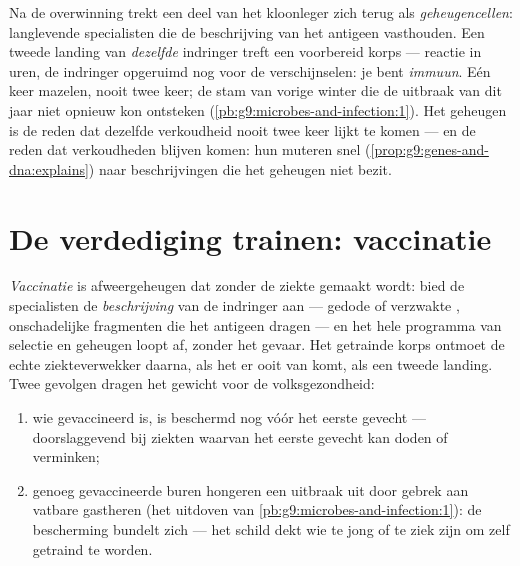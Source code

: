 \begin{definition}[Afweergeheugen]\label{def:g9:immune-defenses:memory}
Na de overwinning trekt een deel van het kloonleger zich terug als
\emph{geheugencellen}: langlevende specialisten
die de beschrijving van het antigeen vasthouden. Een tweede landing
van \emph{dezelfde} indringer treft een voorbereid korps ---
reactie in uren, de indringer opgeruimd nog voor de verschijnselen:
je bent \emph{immuun}. Eén keer mazelen, nooit
twee keer; de stam van vorige winter die de uitbraak van dit jaar
niet opnieuw kon ontsteken
(\cref{pb:g9:microbes-and-infection:1}). Het geheugen is de reden
dat dezelfde verkoudheid nooit twee keer lijkt te komen --- en de
reden dat verkoudheden blijven komen: hun  muteren snel
(\cref{prop:g9:genes-and-dna:explains}) naar beschrijvingen die het
geheugen niet bezit.
\end{definition}

\section{De verdediging trainen: vaccinatie}

\begin{proposition}[Vaccinatie]\label{prop:g9:immune-defenses:vaccination}
\emph{Vaccinatie} is afweergeheugen dat zonder de
ziekte gemaakt wordt: bied de specialisten de \emph{beschrijving}
van de indringer aan --- gedode of verzwakte ,
onschadelijke fragmenten die het antigeen dragen --- en het hele
programma van selectie en geheugen loopt af, zonder het gevaar. Het
getrainde korps ontmoet de echte ziekteverwekker daarna, als het er
ooit van komt, als een tweede landing. Twee gevolgen dragen het
gewicht voor de volksgezondheid:
\begin{enumerate}
  \item wie gevaccineerd is, is beschermd nog vóór het eerste
        gevecht --- doorslaggevend bij ziekten waarvan het eerste
        gevecht kan doden of verminken;
  \item genoeg gevaccineerde buren hongeren een uitbraak uit door
        gebrek aan vatbare gastheren (het uitdoven van
        \cref{pb:g9:microbes-and-infection:1}): de bescherming
        bundelt zich --- het schild dekt wie te jong of te ziek
        zijn om zelf getraind te worden.
\end{enumerate}
\end{proposition}
\admitted

